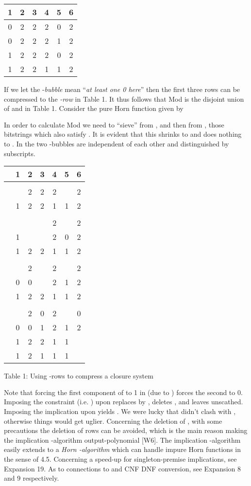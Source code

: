 \documentclass[11pt]{article}
\begin{document}
\begin{tabular}{|c|c|c|c|c|c|}
1 & 2 & 3& 4 & 5 & 6\\ \hline \hline
0 & 2 & 2 & 2& 0 & 2 \\ \hline
0 & 2 & 2 & 2 & 1 & 2 \\ \hline
1 & 2 &  2& 2& 0 & 2\\ \hline
1 & 2 & 2 & 1 & 1& 2 \\ \hline \end{tabular}

If we let the  -{\it bubble}  mean ``{\it at least one 0 here}'' then the first three rows can be compressed to the {\it -row}  in Table 1. It thus follows that Mod is the disjoint union of  and  in Table 1. Consider the pure Horn function  given by

In order to calculate Mod we
 need to ``sieve'' from , and then from , those bitstrings which also satisfy . It is evident that this shrinks  to  and does nothing to .  In  the two -bubbles are independent of each other and distinguished by subscripts.

\begin{tabular}{c|c|c|c|c|c|c|}
& 1 & 2 & 3 & 4 & 5 & 6 \\ \hline
& & & & &     &\\ \hline
 &  & 2 & 2 & 2&  & 2\\ \hline
 & 1 & 2 & 2 & 1 & 1& 2\\ \hline
& & & & & & \\ \hline
 &  &  &  & 2 &  & 2\\ \hline
 & 1 &  &  & 2 & 0 & 2 \\ \hline
 & 1 & 2& 2 & 1 & 1& 2 \\ \hline
 & & & & & & \\ \hline
  &  & 2 &  & 2 &  & 2 \\ \hline
  & 0 & 0 &  & 2 & 1 & 2\\ \hline
  & 1 & 2& 2& 1 & 1& 2 \\ \hline
  & & & & & & \\ \hline
 &  & 2 & 0 & 2 &  & 0\\ \hline
 & 0 & 0 & 1 & 2& 1 & 2\\ \hline
 & 1& 2 & 2 & 1& 1&  \\ \hline
 & 1 & 2& 1 & 1 & 1&  \\ \hline   \end{tabular}

Table 1: Using -rows to compress a closure system

Note that forcing the first component of  to 1 in  (due to ) forces the second to 0. Imposing the constraint  (i.e. ) upon  replaces  by , deletes , and leaves  unscathed. Imposing the implication  upon  yields . We were lucky that  didn't clash with , otherwise things  would get uglier. Concerning the deletion of , with some precautions the deletion of rows can be avoided, which is the main reason making the implication -algorithm output-polynomial [W6]. The implication -algorithm easily extends to a {\it Horn -algorithm} which can handle impure Horn functions in the sense of 4.5.  Concerning a speed-up for singleton-premise implications, see Expansion 19. As to connections to  and CNF  DNF conversion, see Expansion 8 and 9 respectively.
\end{document}
